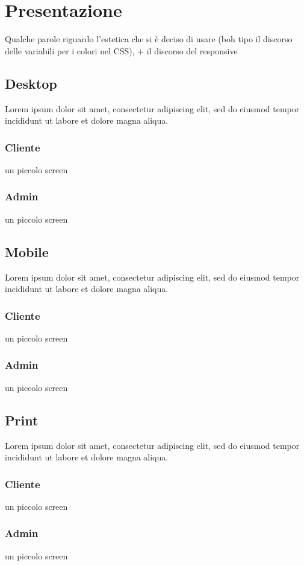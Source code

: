 \section{Presentazione}
Qualche parole riguardo l'estetica che si è deciso di usare (boh tipo il discorso delle variabili per i colori nel CSS), + il discorso del responsive
\subsection{Desktop}
Lorem ipsum dolor sit amet, consectetur adipiscing elit, sed do eiusmod tempor incididunt ut labore et dolore magna aliqua. 
\subsubsection{Cliente}
un piccolo screen
\subsubsection{Admin}
un piccolo screen

\subsection{Mobile}
Lorem ipsum dolor sit amet, consectetur adipiscing elit, sed do eiusmod tempor incididunt ut labore et dolore magna aliqua. 
\subsubsection{Cliente}
un piccolo screen
\subsubsection{Admin}
un piccolo screen

\subsection{Print}
Lorem ipsum dolor sit amet, consectetur adipiscing elit, sed do eiusmod tempor incididunt ut labore et dolore magna aliqua. 
\subsubsection{Cliente}
un piccolo screen
\subsubsection{Admin}
un piccolo screen